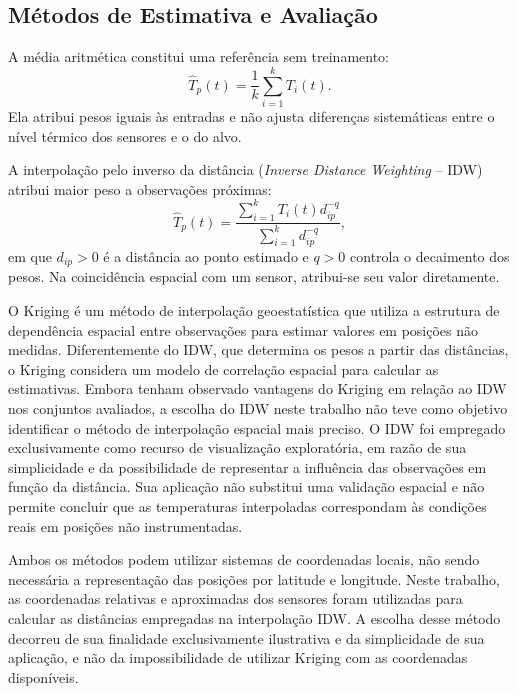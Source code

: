 \subsection{Métodos de Estimativa e Avaliação}
\label{subsec:metodos_estimativa}

A média aritmética constitui uma referência sem treinamento:
\begin{equation}
    \widehat{T}_p(t)=\frac{1}{k}\sum_{i=1}^{k}T_i(t).
    \label{eq:media_sensores}
\end{equation}
Ela atribui pesos iguais às entradas e não ajusta diferenças sistemáticas
entre o nível térmico dos sensores e o do alvo.

A interpolação pelo inverso da distância (\textit{Inverse Distance
Weighting} -- IDW) atribui maior peso a observações próximas:
\begin{equation}
    \widehat{T}_p(t)=
    \frac{\sum_{i=1}^{k}T_i(t)d_{ip}^{-q}}
         {\sum_{i=1}^{k}d_{ip}^{-q}},
    \label{eq:idw}
\end{equation}
em que $d_{ip}>0$ é a distância ao ponto estimado e $q>0$ controla
o decaimento dos pesos. Na coincidência espacial com um sensor,
atribui-se seu valor diretamente. 

O Kriging é um método de interpolação geoestatística que utiliza a estrutura de dependência espacial entre observações para estimar valores em posições não medidas. Diferentemente do IDW, que determina os pesos a partir das distâncias, o Kriging considera um modelo de correlação espacial para calcular as estimativas.
Embora  tenham observado vantagens do Kriging em relação ao IDW nos conjuntos avaliados, a escolha do IDW neste trabalho não teve como objetivo identificar o método de interpolação espacial mais preciso. O IDW foi empregado exclusivamente como recurso de visualização exploratória, em razão de sua simplicidade e da possibilidade de representar a influência das observações em função da distância. Sua aplicação não substitui uma validação espacial e não permite concluir que as temperaturas interpoladas correspondam às condições reais em posições não instrumentadas.

Ambos os métodos podem utilizar sistemas de coordenadas locais, não sendo necessária a representação das posições por latitude e longitude. Neste trabalho, as coordenadas relativas e aproximadas dos sensores foram utilizadas para calcular as distâncias empregadas na interpolação IDW. A escolha desse método decorreu de sua finalidade exclusivamente ilustrativa e da simplicidade de sua aplicação, e não da impossibilidade de utilizar Kriging com as coordenadas disponíveis.

